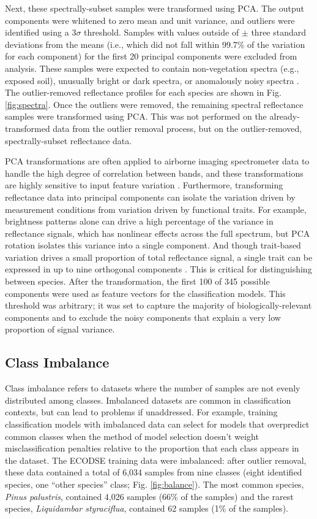 Next, these spectrally-subset samples were transformed using PCA. The output components were whitened to zero mean and unit variance, and outliers were identified using a $3\sigma$ threshold. Samples with values outside of $\pm$ three standard deviations from the means (i.e., which did not fall within 99.7\% of the variation for each component) for the first 20 principal components were excluded from analysis. These samples were expected to contain non-vegetation spectra (e.g., exposed soil), unusually bright or dark spectra, or anomalously noisy spectra \cite{Feret2014-bb}. The outlier-removed reflectance profiles for each species are shown in Fig. \ref{fig:spectra}. Once the outliers were removed, the remaining spectral reflectance samples were transformed using PCA. This was not performed on the already-transformed data from the outlier removal process, but on the outlier-removed, spectrally-subset reflectance data.

PCA transformations are often applied to airborne imaging spectrometer data to handle the high degree of correlation between bands, and these transformations are highly sensitive to input feature variation \cite{Jia1999-sd}. Furthermore, transforming reflectance data into principal components can isolate the variation driven by measurement conditions from variation driven by functional traits. For example, brightness patterns alone can drive a high percentage of the variance in reflectance signals, which has nonlinear effects across the full spectrum, but PCA rotation isolates this variance into a single component. And though trait-based variation drives a small proportion of total reflectance signal, a single trait can be expressed in up to nine orthogonal components \cite{Asner2015-fx}. This is critical for distinguishing between species. After the transformation, the first 100 of 345 possible components were used as feature vectors for the classification models. This threshold was arbitrary; it was set to capture the majority of biologically-relevant components and to exclude the noisy components that explain a very low proportion of signal variance.

\subsection{Class Imbalance}

Class imbalance refers to datasets where the number of samples are not evenly distributed among classes. Imbalanced datasets are common in classification contexts, but can lead to problems if unaddressed. For example, training classification models with imbalanced data can select for models that overpredict common classes when the method of model selection doesn't weight misclassification penalties relative to the proportion that each class appears in the dataset. The ECODSE training data were imbalanced: after outlier removal, these data contained a total of 6,034 samples from nine classes (eight identified species, one “other species” class; Fig. \ref{fig:balance}). The most common species, \textit{Pinus palustris}, contained 4,026 samples (66\% of the samples) and the rarest species, \textit{Liquidambar styraciflua}, contained 62 samples (1\% of the samples).


